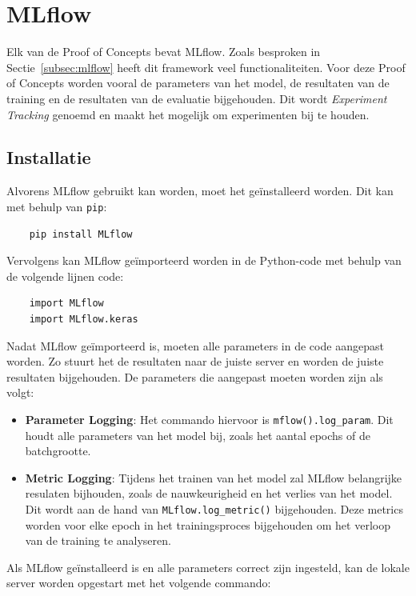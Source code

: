 
\section{MLflow}

Elk van de Proof of Concepts bevat MLflow. Zoals besproken in Sectie~\ref{subsec:mlflow} heeft dit framework veel functionaliteiten. Voor deze Proof of Concepts worden vooral de parameters van het model, de resultaten van de training en de resultaten van de evaluatie bijgehouden. Dit wordt \textit{Experiment Tracking} genoemd en maakt het mogelijk om experimenten bij te houden.

\subsection{Installatie}

Alvorens MLflow gebruikt kan worden, moet het geïnstalleerd worden. Dit kan met behulp van \texttt{pip}:

\begin{verbatim}
    pip install MLflow
\end{verbatim}

Vervolgens kan MLflow geïmporteerd worden in de Python-code met behulp van de volgende lijnen code:

\begin{verbatim}
    import MLflow
    import MLflow.keras
\end{verbatim}

Nadat MLflow geïmporteerd is, moeten alle parameters in de code aangepast worden. Zo stuurt het de resultaten naar de juiste server en worden de juiste resultaten bijgehouden. De parameters die aangepast moeten worden zijn als volgt:

\begin{itemize}
    \item \textbf{Parameter Logging}: Het commando hiervoor is \texttt{mflow().log\_param}. Dit houdt alle parameters van het model bij, zoals het aantal epochs of de batchgrootte.
    \item \textbf{Metric Logging}: Tijdens het trainen van het model zal MLflow belangrijke resulaten bijhouden, zoals de nauwkeurigheid en het verlies van het model. Dit wordt aan de hand van \texttt{MLflow.log\_metric()} bijgehouden. Deze metrics worden voor elke epoch in het trainingsproces bijgehouden om het verloop van de training te analyseren.
\end{itemize}

Als MLflow geïnstalleerd is en alle parameters correct zijn ingesteld, kan de lokale server worden opgestart met het volgende commando:

